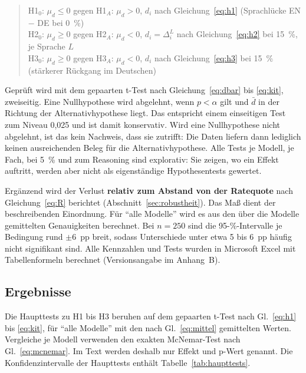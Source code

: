 \documentclass[a4paper,titlepage]{article}
\numberwithin{equation}{section} %
\begin{document}
\begin{quote}
H1$_0$: $\mu_d \leq 0$ gegen H1$_A$: $\mu_d > 0$, $d_i$ nach Gleichung~\eqref{eq:h1} (Sprachlücke EN $-$ DE bei 0~\%)\\[1mm]
H2$_0$: $\mu_d \geq 0$ gegen H2$_A$: $\mu_d < 0$, $d_i = \Delta_i^L$ nach Gleichung~\eqref{eq:h2} bei 15~\%, je Sprache $L$\\[1mm]
H3$_0$: $\mu_d \geq 0$ gegen H3$_A$: $\mu_d < 0$, $d_i$ nach Gleichung~\eqref{eq:h3} bei 15~\% (stärkerer Rückgang im Deutschen)
\end{quote}

Geprüft wird mit dem gepaarten t-Test nach Gleichung~\eqref{eq:dbar} bis \eqref{eq:kit}, zweiseitig. Eine Nullhypothese wird abgelehnt, wenn $p < \alpha$ gilt und $\bar{d}$ in der Richtung der Alternativhypothese liegt. Das entspricht einem einseitigen Test zum Niveau 0,025 und ist damit konservativ. Wird eine Nullhypothese nicht abgelehnt, ist das kein Nachweis, dass sie zutrifft: Die Daten liefern dann lediglich keinen ausreichenden Beleg für die Alternativhypothese. Alle Tests je Modell, je Fach, bei 5~\% und zum Reasoning sind explorativ: Sie zeigen, wo ein Effekt auftritt, werden aber nicht als eigenständige Hypothesentests gewertet.

Ergänzend wird der Verlust \textbf{relativ zum Abstand von der Ratequote} nach Gleichung~\eqref{eq:R} berichtet (Abschnitt~\ref{sec:robustheit}). Das Maß dient der beschreibenden Einordnung. Für "`alle Modelle"' wird es aus den über die Modelle gemittelten Genauigkeiten berechnet. Bei $n = 250$ sind die 95-\%-Intervalle je Bedingung rund $\pm 6$~pp breit, sodass Unterschiede unter etwa 5 bis 6~pp häufig nicht signifikant sind. Alle Kennzahlen und Tests wurden in Microsoft Excel mit Tabellenformeln berechnet (Versionsangabe im Anhang~B).


\subsection{Ergebnisse}\label{sec:ergebnisse}

Die Haupttests zu H1 bis H3 beruhen auf dem gepaarten t-Test nach Gl.~\eqref{eq:h1} bis \eqref{eq:kit}, für "`alle Modelle"' mit den nach Gl.~\eqref{eq:mittel} gemittelten Werten. Vergleiche je Modell verwenden den exakten McNemar-Test nach Gl.~\eqref{eq:mcnemar}. Im Text werden deshalb nur Effekt und p-Wert genannt. Die Konfidenzintervalle der Haupttests enthält Tabelle~\ref{tab:haupttests}.
\end{document}
